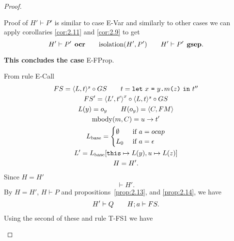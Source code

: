 \begin{proof}
\begin{description}
\begin{description}
\begin{description}
              Proof of $H' \vdash P'$ is similar to case {\sc E-Var} and
              similarly to other cases we can apply corollaries \ref{cor:2.11}
              and \ref{cor:2.9} to get
              \begin{equation}
                H' \vdash P' \:\: \mbox{\bf ocr} \quad\quad \mbox{$\mathrm{isolation}$}(H', P') \quad\quad H'
                \vdash P' \:\: \mbox{\bf gsep}.
              \end{equation}

              {\bf This concludes the case} {\sc E-FProp}.
          \end{description}

        \item[Case {\sc E-Call}:] From rule {\sc E-Call}
          \begin{equation} \label{eq:ecall1}
            \begin{gathered}
              FS = \mbox{$\langle L, t \rangle^s$} \circ GS \quad\quad t = \mbox{\mdseries\texttt{let}~$x$~\texttt{=}~$\mbox{\mdseries$y$\texttt{.}$m$\texttt{(}$z$\texttt{)}}$~\texttt{in}~$t''$}\\
              FS' = \mbox{$\langle L', t' \rangle$}^x \circ \mbox{$\langle L, t \rangle^s$} \circ GS \\
              L(y) = o_y \quad\quad H(o_y) = \mbox{$\langle C, FM \rangle$} \\
              \mbox{$\mathrm{mbody}$}(m, C) = u \to t' \\
              L_{\text{base}} =
              \begin{cases}
                \emptyset & \text{ if } a = \mbox{$ocap$} \\
                L_0       & \text{ if } a = \mbox{$\epsilon$}
              \end{cases} \\
              L' = L_{\text{base}}[\mbox{\mdseries\texttt{this}} \mapsto L(y), u \mapsto L(z)] \\
              H = H'.
            \end{gathered}
          \end{equation}
          Since $H = H'$ 
          \begin{equation*}
            \vdash H'.
          \end{equation*}
          By $H = H'$, $H \vdash P$ and propositions~\ref{prop:2.13},
          and \ref{prop:2.14},  we have
          \begin{equation}
            \begin{gathered}
              H' \vdash Q \quad\quad H;a \vdash FS.
            \end{gathered}
          \end{equation}
          Using the second of these and rule {\sc T-FS1} we have

\end{description}
\end{description}
\end{proof}
